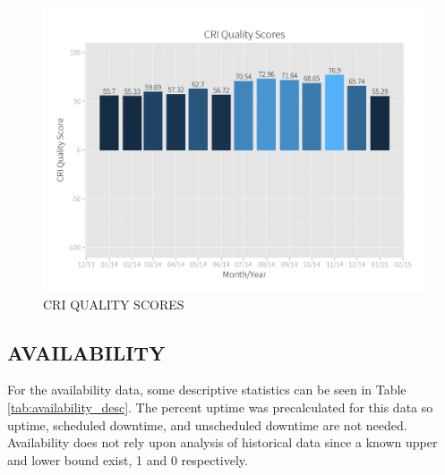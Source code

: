 \documentclass[SDSUThesis.tex]{subfiles}
\begin{document}
        \begin{figure}[htb]
            \centering
            \includegraphics[scale=.3]{images/quality_scores.png}
            \caption{CRI QUALITY SCORES}
            \label{fig:quality-scores}
        \end{figure}
        
        
        
        
    \subsection{AVAILABILITY}
        For the availability data,
        some descriptive statistics can be seen in 
        Table \ref{tab:availability_desc}.  The percent uptime
        was precalculated for this data so uptime, scheduled downtime,
        and unscheduled downtime are not needed.  Availability
        does not rely upon analysis of historical data since
        a known upper and lower bound exist, 1 and 0 respectively.
        
\end{document}
